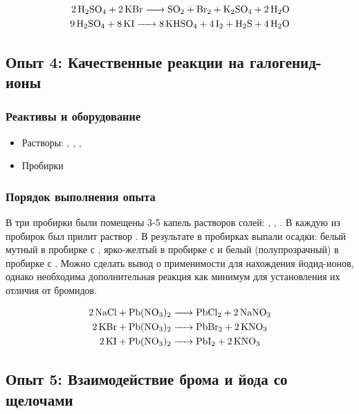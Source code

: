 \documentclass[a4paper, 12pt]{article}
\begin{document}
\begin{align}
	\ce{2H2SO4 + 2 KBr -> SO2 + Br2 + K2SO4 + 2H2O}\\
	\ce{9H2SO4 + 8 KI -> 8KHSO4 + 4 I2 + H2S + 4H2O}
\end{align}


\subsection{Опыт 4: Качественные реакции на галогенид-ионы}

\subsubsection{Реактивы и оборудование}

\begin{itemize}
	\item Растворы: , , , 
	
	\item Пробирки
\end{itemize}

\subsubsection{Порядок выполнения опыта}

В три пробирки были помещены 3-5 капель растворов солей: , , . В каждую из пробирок был прилит раствор . В результате в пробирках выпали осадки: белый мутный в пробирке с , ярко-желтый в пробирке с  и белый (полупрозрачный) в пробирке с . Можно сделать вывод о применимости  для нахождения йодид-ионов, однако необходима дополнительная реакция как минимум для установления их отличия от бромидов. %

\begin{align}
	\ce{2NaCl + Pb(NO3)2 &-> PbCl2 + 2 NaNO3}\\
	\ce{2KBr + Pb(NO3)2 &-> PbBr2 + 2 KNO3}\\
	\ce{2KI + Pb(NO3)2 &-> PbI2 + 2 KNO3}\\
\end{align}


\subsection{Опыт 5: Взаимодействие брома и йода со щелочами}
\end{document}

